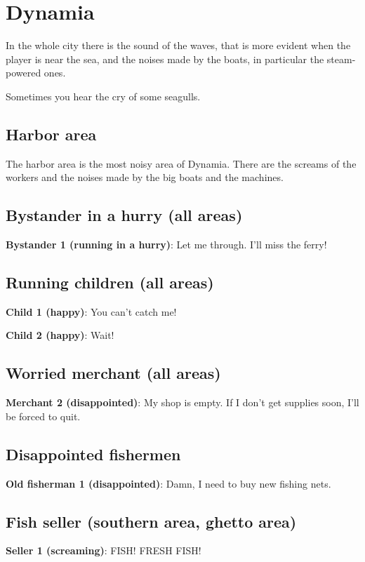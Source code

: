 \section{Dynamia}

In the whole city there is the sound of the waves, that is more evident when the player is near the sea, and the noises made by the boats, in particular the steam-powered ones.

Sometimes you hear the cry of some seagulls.

\subsection{Harbor area}
The harbor area is the most noisy area of Dynamia. There are the screams of the workers and the noises made by the big boats and the machines.

\subsection{Bystander in a hurry (all areas)}
\textbf{Bystander 1 (running in a hurry)}: Let me through. I'll miss the ferry!

\subsection{Running children (all areas)}
\textbf{Child 1 (happy)}: You can't catch me!

\textbf{Child 2 (happy)}: Wait!

\subsection{Worried merchant (all areas)}
\textbf{Merchant 2 (disappointed)}: My shop is empty. If I don't get supplies soon, I'll be forced to quit.

\subsection{Disappointed fishermen}
\textbf{Old fisherman 1 (disappointed)}: Damn, I need to buy new fishing nets.

\subsection{Fish seller (southern area, ghetto area)}
\textbf{Seller 1 (screaming)}: FISH! FRESH FISH!

